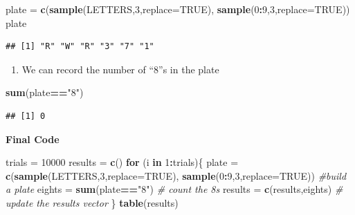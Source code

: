 \documentclass[
]{book}
\newenvironment{Shaded}{\begin{snugshade}}{\end{snugshade}}
\newcommand{\AttributeTok}[1]{\textcolor[rgb]{0.13,0.29,0.53}{#1}}
\newcommand{\CommentTok}[1]{\textcolor[rgb]{0.56,0.35,0.01}{\textit{#1}}}
\newcommand{\ConstantTok}[1]{\textcolor[rgb]{0.56,0.35,0.01}{#1}}
\newcommand{\ControlFlowTok}[1]{\textcolor[rgb]{0.13,0.29,0.53}{\textbf{#1}}}
\newcommand{\DecValTok}[1]{\textcolor[rgb]{0.00,0.00,0.81}{#1}}
\newcommand{\FunctionTok}[1]{\textcolor[rgb]{0.13,0.29,0.53}{\textbf{#1}}}
\newcommand{\NormalTok}[1]{#1}
\newcommand{\OtherTok}[1]{\textcolor[rgb]{0.56,0.35,0.01}{#1}}
\newcommand{\SpecialCharTok}[1]{\textcolor[rgb]{0.81,0.36,0.00}{\textbf{#1}}}
\newcommand{\StringTok}[1]{\textcolor[rgb]{0.31,0.60,0.02}{#1}}
\providecommand{\tightlist}{%
  \setlength{\itemsep}{0pt}\setlength{\parskip}{0pt}}
\theoremstyle{definition}
\theoremstyle{definition}
\theoremstyle{definition}
\theoremstyle{definition}
\theoremstyle{remark}
\begin{document}
\begin{Shaded}
\begin{Highlighting}[]
\NormalTok{plate }\OtherTok{=} \FunctionTok{c}\NormalTok{(}\FunctionTok{sample}\NormalTok{(LETTERS,}\DecValTok{3}\NormalTok{,}\AttributeTok{replace=}\ConstantTok{TRUE}\NormalTok{),}
          \FunctionTok{sample}\NormalTok{(}\DecValTok{0}\SpecialCharTok{:}\DecValTok{9}\NormalTok{,}\DecValTok{3}\NormalTok{,}\AttributeTok{replace=}\ConstantTok{TRUE}\NormalTok{))}
\NormalTok{plate}
\end{Highlighting}
\end{Shaded}

\begin{verbatim}
## [1] "R" "W" "R" "3" "7" "1"
\end{verbatim}

\begin{enumerate}
\def\labelenumi{\arabic{enumi}.}
\setcounter{enumi}{1}
\tightlist
\item
  We can record the number of ``8''s in the plate
\end{enumerate}

\begin{Shaded}
\begin{Highlighting}[]
\FunctionTok{sum}\NormalTok{(plate}\SpecialCharTok{==}\StringTok{"8"}\NormalTok{)}
\end{Highlighting}
\end{Shaded}

\begin{verbatim}
## [1] 0
\end{verbatim}

\textbf{Final Code}

\begin{Shaded}
\begin{Highlighting}[]
\NormalTok{trials }\OtherTok{=} \DecValTok{10000}
\NormalTok{results }\OtherTok{=} \FunctionTok{c}\NormalTok{()}
\ControlFlowTok{for}\NormalTok{ (i }\ControlFlowTok{in} \DecValTok{1}\SpecialCharTok{:}\NormalTok{trials)\{}
\NormalTok{  plate }\OtherTok{=} \FunctionTok{c}\NormalTok{(}\FunctionTok{sample}\NormalTok{(LETTERS,}\DecValTok{3}\NormalTok{,}\AttributeTok{replace=}\ConstantTok{TRUE}\NormalTok{),}
            \FunctionTok{sample}\NormalTok{(}\DecValTok{0}\SpecialCharTok{:}\DecValTok{9}\NormalTok{,}\DecValTok{3}\NormalTok{,}\AttributeTok{replace=}\ConstantTok{TRUE}\NormalTok{)) }\CommentTok{\#build a plate}
\NormalTok{  eights }\OtherTok{=} \FunctionTok{sum}\NormalTok{(plate}\SpecialCharTok{==}\StringTok{"8"}\NormalTok{) }\CommentTok{\# count the 8s}
\NormalTok{  results }\OtherTok{=} \FunctionTok{c}\NormalTok{(results,eights) }\CommentTok{\# update the results vector}
\NormalTok{\}}
\FunctionTok{table}\NormalTok{(results)}
\end{Highlighting}
\end{Shaded}
\end{document}
